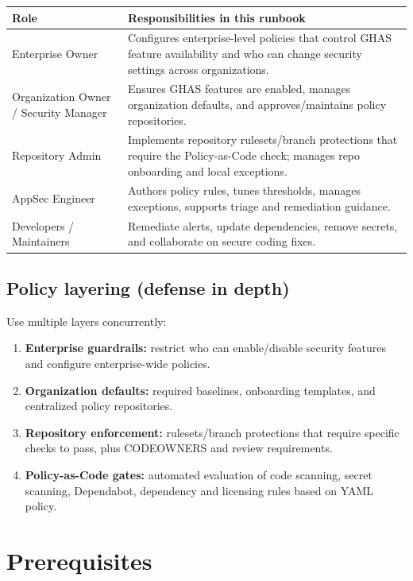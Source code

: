 \documentclass[11pt]{article}
\begin{document}
\begin{longtable}{@{}p{}p{}@{}}
\toprule
Role & Responsibilities in this runbook \\
\midrule
Enterprise Owner & Configures enterprise-level policies that control GHAS feature availability and who can change security settings across organizations. \\
Organization Owner / Security Manager & Ensures GHAS features are enabled, manages organization defaults, and approves/maintains policy repositories. \\
Repository Admin & Implements repository rulesets/branch protections that require the Policy-as-Code check; manages repo onboarding and local exceptions. \\
AppSec Engineer & Authors policy rules, tunes thresholds, manages exceptions, supports triage and remediation guidance. \\
Developers / Maintainers & Remediate alerts, update dependencies, remove secrets, and collaborate on secure coding fixes. \\
\bottomrule
\end{longtable}

\subsection{Policy layering (defense in depth)}

Use multiple layers concurrently:
\begin{enumerate}[leftmargin=*]
  \item \textbf{Enterprise guardrails:} restrict who can enable/disable security features and configure enterprise-wide policies.
  \item \textbf{Organization defaults:} required baselines, onboarding templates, and centralized policy repositories.
  \item \textbf{Repository enforcement:} rulesets/branch protections that require specific checks to pass, plus CODEOWNERS and review requirements.
  \item \textbf{Policy-as-Code gates:} automated evaluation of code scanning, secret scanning, Dependabot, dependency and licensing rules based on YAML policy.
\end{enumerate}

\section{Prerequisites}
\end{document}
